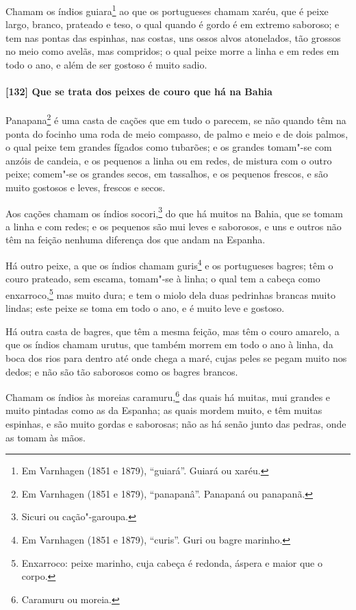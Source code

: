 Chamam os índios guiara\footnote{ Em Varnhagen (1851 e 1879), ``guiará''. Guiará ou
xaréu.} ao que os portugueses chamam xaréu, que é peixe largo, branco, prateado e teso, o
qual quando é gordo é em extremo saboroso; e tem nas pontas das espinhas, nas costas, uns
ossos alvos atonelados, tão grossos no meio como avelãs, mas compridos; o qual peixe morre
a linha e em redes em todo o ano, e além de ser gostoso é muito sadio.

\paragraph{[132] Que se trata dos peixes de couro que há na Bahia}\quad
Panapana\footnote{ Em Varnhagen (1851 e 1879), ``panapanâ''. Panapaná ou panapanã.} é uma
casta de cações que em tudo o parecem, se não quando têm na ponta do focinho uma roda de
meio compasso, de palmo e meio e de dois palmos, o qual peixe tem grandes fígados como
tubarões; e os grandes tomam"-se com anzóis de candeia, e os pequenos a linha ou em redes,
de mistura com o outro peixe; comem"-se os grandes secos, em tassalhos, e os pequenos
frescos, e são muito gostosos e leves, frescos e secos.

Aos cações chamam os índios socori,\footnote{ Sicuri ou cação"-garoupa.} do que há muitos
na Bahia, que se tomam a linha e com redes; e os pequenos são mui leves e saborosos, e uns
e outros não têm na feição nenhuma diferença dos que andam na Espanha.

Há outro peixe, a que os índios chamam guris\footnote{ Em Varnhagen (1851 e 1879),
``curis''. Guri ou bagre marinho.} e os portugueses bagres; têm o couro prateado, sem
escama, tomam"-se à linha; o qual tem a cabeça como enxarroco,\footnote{ Enxarroco: peixe
marinho, cuja cabeça é redonda, áspera e maior que o corpo.} mas muito dura; e tem o
miolo dela duas pedrinhas brancas muito lindas; este peixe se toma em todo o ano, e é
muito leve e gostoso.

Há outra casta de bagres, que têm a mesma feição, mas têm o couro amarelo, a que os índios
chamam urutus, que também morrem em todo o ano à linha, da boca dos rios para dentro até
onde chega a maré, cujas peles se pegam muito nos dedos; e não são tão saborosos como os
bagres brancos.

Chamam os índios às moreias caramuru,\footnote{ Caramuru ou moreia.} das quais há muitas,
mui grandes e muito pintadas como as da Espanha; as quais mordem muito, e têm muitas
espinhas, e são muito gordas e saborosas; não as há senão junto das pedras, onde as tomam
às mãos.

